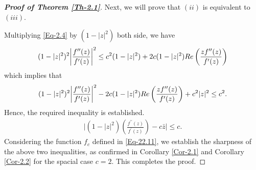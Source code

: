 \documentclass[10pt,a4paper]{amsart}
\begin{document}
\begin{proof}[\bf Proof of Theorem \ref{Th-2.1}]
	\noindent Next, we will prove that $(ii)$ is equivalent to $(iii)$.\vspace{2mm} 
	
	\noindent Multiplying \eqref{Eq-2.4} by $(1-|z|^2)$ both side, we have
	\begin{align*}
		(1-|z|^2)^2\bigg|\frac{f^{\prime\prime}(z)}{f^{\prime}(z)}\bigg|^2\leq c^2(1-|z|^2)+2c(1-|z|^2){\rm Re}\left(\frac{zf^{\prime\prime}(z)}{f^{\prime}(z)}\right)
	\end{align*}
	which implies that 
	\begin{align*}
		(1-|z|^2)^2\bigg|\frac{f^{\prime\prime}(z)}{f^{\prime}(z)}\bigg|^2-2c(1-|z|^2){\rm Re}\left(\frac{zf^{\prime\prime}(z)}{f^{\prime}(z)}\right)+c^2|z|^2\leq c^2.
	\end{align*}
	Hence, the required inequality is established.
	\begin{align*}
		\bigg|	(1-|z|^2)\left(\frac{f^{\prime\prime}(z)}{f^{\prime}(z)}\right)-c\bar{z}\bigg|\leq c.
	\end{align*}
	Considering the function \( f_c \) defined in \eqref{Eq-22.11}, we establish the sharpness of the above two inequalities, as confirmed in Corollary \ref{Cor-2.1} and Corollary \ref{Cor-2.2} for the spacial case \( c= 2 \). This completes the proof.
\end{proof}
\end{document}
